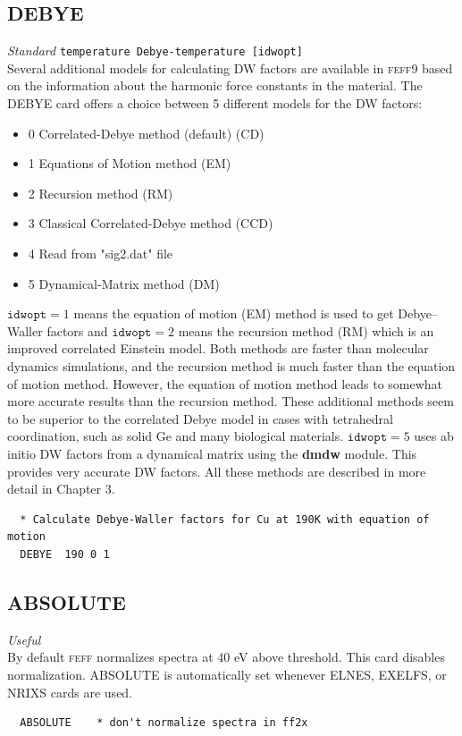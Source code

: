 \documentclass[11pt,oneside]{report} %
\renewcommand{\htmlref}[2]{\hyperlink{#2}{#1}}
\newcommand{\program}[1]{\textsc{#1}}
\newcommand{\feff}{\program{feff}}
\newcommand{\vnum}{9}
\newcommand{\feffcur}{\feff\vnum}
\newenvironment{Card}[4]%
      {\vspace{3ex}%
        \subsection{#1}
        \quad\textsl{#3}\newline
        \quad\texttt{#2}\newline%
        \label{card:#4}\\}
      {}
\newcommand{\module}[1]{\textrm{\bf{#1}}}
\renewcommand{\htmlref}[2]{{#1}} %
\begin{document}
\begin{latexonly}
\begin{Card}{DEBYE}{temperature  Debye-temperature [idwopt]}{Standard}{deb2}
   Several additional models for
  calculating DW factors are available in {\feffcur} based on the information
  about the harmonic force constants in the material.  The \htmlref{DEBYE}{car:deb2} card offers a choice between 5 different models for the DW factors:
\begin{itemize}
				\item  0 	Correlated-Debye method  (default) (CD)
				\item  1	 Equations of Motion method (EM)
				\item  2	 Recursion method (RM)
				\item  3	 Classical Correlated-Debye method (CCD)
				\item  4	 Read from "sig2.dat" file
				\item  5	 Dynamical-Matrix method (DM)
\end{itemize}  
  $\mathtt{idwopt}=1$
  means the equation of motion (EM) method is used to get Debye--Waller
  factors and $\mathtt{idwopt}=2$ means the recursion method (RM) which
  is an improved correlated Einstein model. Both methods are faster than 
  molecular dynamics simulations, and the recursion method is much faster 
  than the equation of motion method. However, the equation of motion method 
  leads to somewhat more accurate results than the recursion method. These 
  additional methods seem to be superior to the correlated Debye model in cases 
  with tetrahedral coordination, such as solid Ge and many biological materials. 
  $\mathtt{idwopt}=5$ uses ab initio DW factors from a dynamical matrix using the \module{dmdw} module.  This provides very accurate DW factors.
  All these methods are described in more detail in \htmlref{Chapter 3}{ref:DWfactors}.

\begin{verbatim}
  * Calculate Debye-Waller factors for Cu at 190K with equation of motion
  DEBYE  190 0 1
\end{verbatim}
\end{Card}
\end{latexonly}



\begin{Card}{ABSOLUTE}{}{Useful}{abs}
  By default {\feff} normalizes spectra at 40 eV above threshold.  This card disables normalization.  ABSOLUTE is automatically
  set whenever ELNES,  EXELFS, or NRIXS cards are used.
\begin{verbatim}
  ABSOLUTE    * don't normalize spectra in ff2x
\end{verbatim}
\end{Card}
\end{document}
